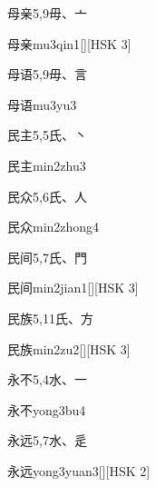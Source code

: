 \begin{entry}{母亲}{5,9}{⽏、⼇}
  \begin{phonetics}{母亲}{mu3qin1}[][HSK 3]
  \end{phonetics}
\end{entry}

\begin{entry}{母语}{5,9}{⽏、⾔}
  \begin{phonetics}{母语}{mu3yu3}
  \end{phonetics}
\end{entry}

\begin{entry}{民主}{5,5}{⽒、⼂}
  \begin{phonetics}{民主}{min2zhu3}
  \end{phonetics}
\end{entry}

\begin{entry}{民众}{5,6}{⽒、⼈}
  \begin{phonetics}{民众}{min2zhong4}
  \end{phonetics}
\end{entry}

\begin{entry}{民间}{5,7}{⽒、⾨}
  \begin{phonetics}{民间}{min2jian1}[][HSK 3]
  \end{phonetics}
\end{entry}

\begin{entry}{民族}{5,11}{⽒、⽅}
  \begin{phonetics}{民族}{min2zu2}[][HSK 3]
  \end{phonetics}
\end{entry}

\begin{entry}{永不}{5,4}{⽔、⼀}
  \begin{phonetics}{永不}{yong3bu4}
  \end{phonetics}
\end{entry}

\begin{entry}{永远}{5,7}{⽔、⾡}
  \begin{phonetics}{永远}{yong3yuan3}[][HSK 2]
  \end{phonetics}
\end{entry}

